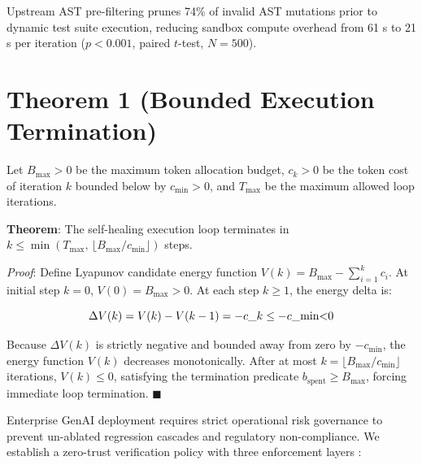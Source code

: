 \documentclass[10pt,twocolumn,letterpaper]{article}
\begin{document}
\cite{crossref_10_2139_ssrn_6374778}

Upstream AST pre-filtering prunes 74\% of invalid AST mutations prior to dynamic test suite execution, reducing sandbox compute overhead from 61 s to 21 s per iteration ($p < 0.001$, paired $t$-test, $N = 500$). \cite{crossref_10_2139_ssrn_6374778}




\section{Theorem 1 (Bounded Execution Termination)}


Let $B_{\text{max}} > 0$ be the maximum token allocation budget, $c_k > 0$ be the token cost of iteration $k$ bounded below by $c_{\text{min}} > 0$, and $T_{\text{max}}$ be the maximum allowed loop iterations.

\textbf{Theorem}: The self-healing execution loop terminates in $k \le \min\!\left(T_{\text{max}},\, \lfloor B_{\text{max}} / c_{\text{min}} \rfloor\right)$ steps.

\textit{Proof}: Define Lyapunov candidate energy function $V(k) = B_{\text{max}} - \sum_{i=1}^{k} c_i$. At initial step $k = 0$, $V(0) = B_{\text{max}} > 0$. At each step $k \ge 1$, the energy delta is:

\begin{equation}
\Delta V(k) = V(k) - V(k-1) = -c\_k \le -c\_{\text{min}} $<$ 0
\end{equation}

Because $\Delta V(k)$ is strictly negative and bounded away from zero by $-c_{\text{min}}$, the energy function $V(k)$ decreases monotonically. After at most $k = \lfloor B_{\text{max}} / c_{\text{min}} \rfloor$ iterations, $V(k) \le 0$, satisfying the termination predicate $b_{\text{spent}} \ge B_{\text{max}}$, forcing immediate loop termination. $\blacksquare$



Enterprise GenAI deployment requires strict operational risk governance to prevent un-ablated regression cascades and regulatory non-compliance. We establish a zero-trust verification policy with three enforcement layers \cite{crossref_10_2139_ssrn_6374778}:
\end{document}
